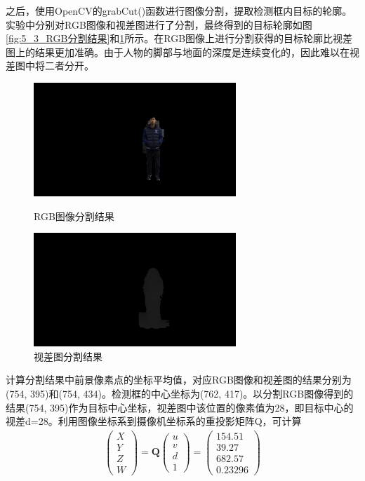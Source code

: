 之后，使用OpenCV的grabCut()函数进行图像分割，提取检测框内目标的轮廓。实验中分别对RGB图像和视差图进行了分割，最终得到的目标轮廓如图\ref{fig:5_3_RGB分割结果}和\ref{fig:5_3_视差图分割结果}所示。在RGB图像上进行分割获得的目标轮廓比视差图上的结果更加准确。由于人物的脚部与地面的深度是连续变化的，因此难以在视差图中将二者分开。
\begin{figure}[htb] %
	\centering
	\begin{minipage}[c]{0.48\textwidth}
		\centering
		\includegraphics[width=3in]{figures/5_实验结果/rgb_seg/left_seg5}
		\caption{RGB图像分割结果}\label{fig:5_3_RGB分割结果}
	\end{minipage}
	\hfill
	\begin{minipage}[c]{0.48\textwidth}
		\centering
		\includegraphics[width=3in]{figures/5_实验结果/disparity_seg/disp_seg5}
		\caption{视差图分割结果}\label{fig:5_3_视差图分割结果}
	\end{minipage}
\end{figure}

计算分割结果中前景像素点的坐标平均值，对应RGB图像和视差图的结果分别为(754, 395)和(754, 434)。检测框的中心坐标为(762, 417)。以分割RGB图像得到的结果(754, 395)作为目标中心坐标，视差图中该位置的像素值为28，即目标中心的视差d=28。利用图像坐标系到摄像机坐标系的重投影矩阵Q，可计算
%
\begin{eqnarray}
\begin{pmatrix} X \\ Y \\ Z \\ W \end{pmatrix}=
\mathbf{Q} \begin{pmatrix} u \\ v \\ d \\ 1 \end{pmatrix}
= \begin{pmatrix} 154.51 \\ 39.27 \\ 682.57 \\ 0.23296 \end{pmatrix}
\end{eqnarray}

